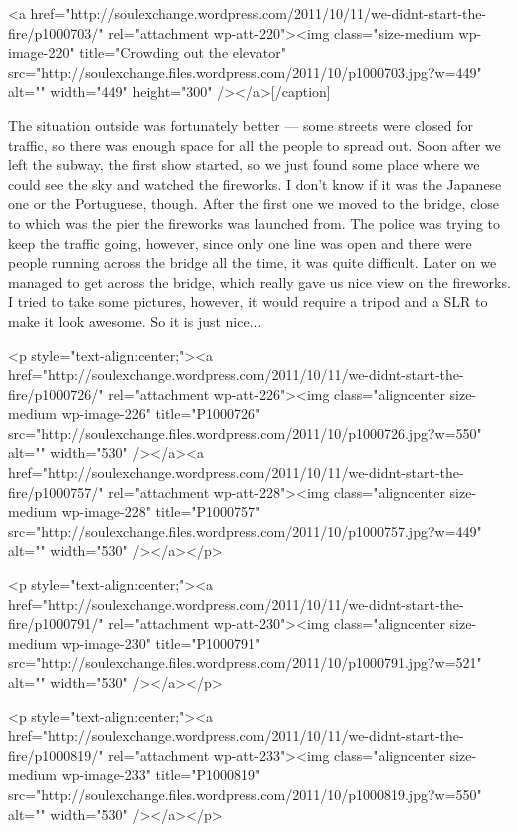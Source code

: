\begin{post}
\begin{content}
[caption id="attachment_220" align="aligncenter" width="449" caption="Crowding out the elevator"]<a href="http://soulexchange.wordpress.com/2011/10/11/we-didnt-start-the-fire/p1000703/" rel="attachment wp-att-220"><img class="size-medium wp-image-220" title="Crowding out the elevator" src="http://soulexchange.files.wordpress.com/2011/10/p1000703.jpg?w=449" alt="" width="449" height="300" /></a>[/caption]



The situation outside was fortunately better — some streets were closed for traffic, so there was enough space for all the people to spread out. Soon after we left the subway, the first show started, so we just found some place where we could see the sky and watched the fireworks. I don't know if it was the Japanese one or the Portuguese, though. After the first one we moved to the bridge, close to which was the pier the fireworks was launched from. The police was trying to keep the traffic going, however, since only one line was open and there were people running across the bridge all the time, it was quite difficult. Later on we managed to get across the bridge, which really gave us nice view on the fireworks. I tried to take some pictures, however, it would require a tripod and a SLR to make it look awesome. So it is just nice...

<p style="text-align:center;"><a href="http://soulexchange.wordpress.com/2011/10/11/we-didnt-start-the-fire/p1000726/" rel="attachment wp-att-226"><img class="aligncenter size-medium wp-image-226" title="P1000726" src="http://soulexchange.files.wordpress.com/2011/10/p1000726.jpg?w=550" alt="" width="530" /></a><a href="http://soulexchange.wordpress.com/2011/10/11/we-didnt-start-the-fire/p1000757/" rel="attachment wp-att-228"><img class="aligncenter size-medium wp-image-228" title="P1000757" src="http://soulexchange.files.wordpress.com/2011/10/p1000757.jpg?w=449" alt="" width="530" /></a></p>

<p style="text-align:center;"><a href="http://soulexchange.wordpress.com/2011/10/11/we-didnt-start-the-fire/p1000791/" rel="attachment wp-att-230"><img class="aligncenter size-medium wp-image-230" title="P1000791" src="http://soulexchange.files.wordpress.com/2011/10/p1000791.jpg?w=521" alt="" width="530" /></a></p>

<p style="text-align:center;"><a href="http://soulexchange.wordpress.com/2011/10/11/we-didnt-start-the-fire/p1000819/" rel="attachment wp-att-233"><img class="aligncenter size-medium wp-image-233" title="P1000819" src="http://soulexchange.files.wordpress.com/2011/10/p1000819.jpg?w=550" alt="" width="530" /></a></p>


\end{content}
\end{post}
